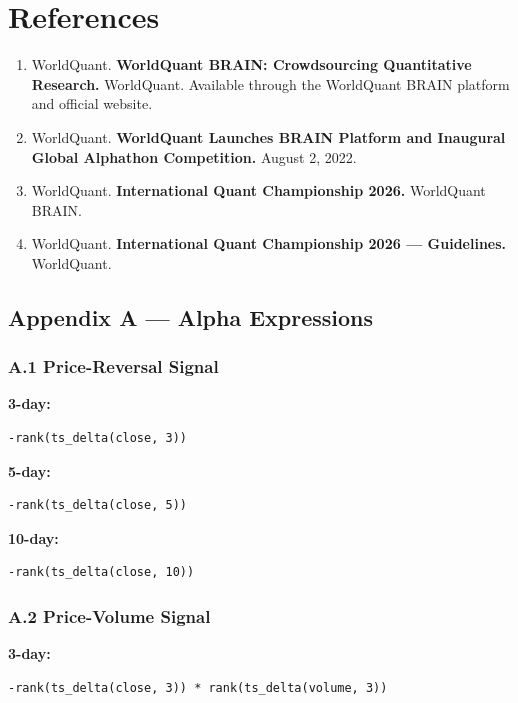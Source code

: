 \documentclass{article}
\begin{document}
\section{References}

\begin{enumerate} 
    \item  WorldQuant. \textbf{WorldQuant BRAIN: Crowdsourcing Quantitative Research.} WorldQuant. Available through the WorldQuant BRAIN platform and official website.   
    \item  WorldQuant. \textbf{WorldQuant Launches BRAIN Platform and Inaugural Global Alphathon Competition.} August 2, 2022.   
    \item  WorldQuant. \textbf{International Quant Championship 2026.} WorldQuant BRAIN.   
    \item  WorldQuant. \textbf{International Quant Championship 2026 — Guidelines.} WorldQuant.   
\end{enumerate}

\subsection{Appendix A — Alpha Expressions}

\subsubsection{A.1 Price-Reversal Signal}

\textbf{3-day:}

\begin{verbatim}
-rank(ts_delta(close, 3))
\end{verbatim}

\textbf{5-day:}

\begin{verbatim}
-rank(ts_delta(close, 5))
\end{verbatim}

\textbf{10-day:}

\begin{verbatim}
-rank(ts_delta(close, 10))
\end{verbatim}

\subsubsection{A.2 Price-Volume Signal}

\textbf{3-day:}

\begin{verbatim}
-rank(ts_delta(close, 3)) * rank(ts_delta(volume, 3))
\end{verbatim}
\end{document}

